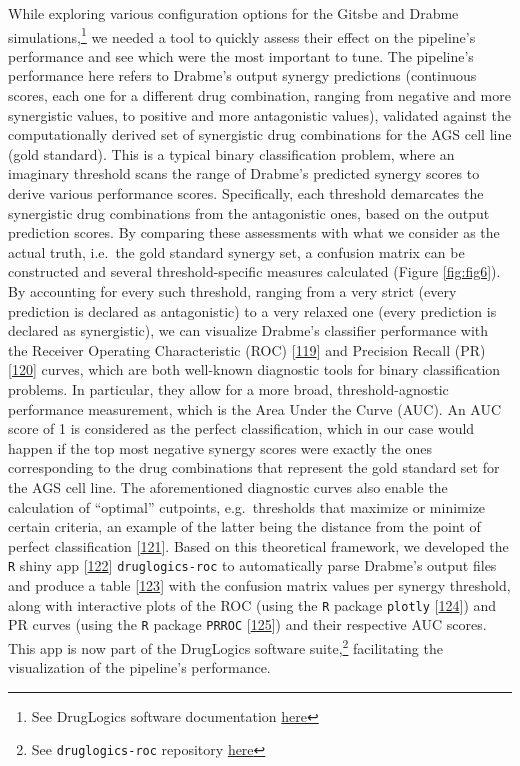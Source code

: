 \documentclass[
  12pt,
]{book}
\begin{document}
While exploring various configuration options for the Gitsbe and Drabme simulations,\footnote{See DrugLogics software documentation \protect\hyperlink{doc-links}{here}} we needed a tool to quickly assess their effect on the pipeline's performance and see which were the most important to tune.
The pipeline's performance here refers to Drabme's output synergy predictions (continuous scores, each one for a different drug combination, ranging from negative and more synergistic values, to positive and more antagonistic values), validated against the computationally derived set of synergistic drug combinations for the AGS cell line (gold standard).
This is a typical binary classification problem, where an imaginary threshold scans the range of Drabme's predicted synergy scores to derive various performance scores.
Specifically, each threshold demarcates the synergistic drug combinations from the antagonistic ones, based on the output prediction scores.
By comparing these assessments with what we consider as the actual truth, i.e.~the gold standard synergy set, a confusion matrix can be constructed and several threshold-specific measures calculated (Figure \ref{fig:fig6}).
By accounting for every such threshold, ranging from a very strict (every prediction is declared as antagonistic) to a very relaxed one (every prediction is declared as synergistic), we can visualize Drabme's classifier performance with the Receiver Operating Characteristic (ROC) {[}\protect\hyperlink{ref-Fawcett2006}{119}{]} and Precision Recall (PR) {[}\protect\hyperlink{ref-Saito2015}{120}{]} curves, which are both well-known diagnostic tools for binary classification problems.
In particular, they allow for a more broad, threshold-agnostic performance measurement, which is the Area Under the Curve (AUC).
An AUC score of 1 is considered as the perfect classification, which in our case would happen if the top most negative synergy scores were exactly the ones corresponding to the drug combinations that represent the gold standard set for the AGS cell line.
The aforementioned diagnostic curves also enable the calculation of ``optimal'' cutpoints, e.g.~thresholds that maximize or minimize certain criteria, an example of the latter being the distance from the point of perfect classification {[}\protect\hyperlink{ref-Perkins2006}{121}{]}.
Based on this theoretical framework, we developed the \texttt{R} shiny app {[}\protect\hyperlink{ref-Chang2021}{122}{]} \texttt{druglogics-roc} to automatically parse Drabme's output files and produce a table {[}\protect\hyperlink{ref-Xie2021}{123}{]} with the confusion matrix values per synergy threshold, along with interactive plots of the ROC (using the \texttt{R} package \texttt{plotly} {[}\protect\hyperlink{ref-Sievert2020}{124}{]}) and PR curves (using the \texttt{R} package \texttt{PRROC} {[}\protect\hyperlink{ref-Grau2015}{125}{]}) and their respective AUC scores.
This app is now part of the DrugLogics software suite,\footnote{See \texttt{druglogics-roc} repository \protect\hyperlink{druglogics-soft-links}{here}} facilitating the visualization of the pipeline's performance.
\end{document}
